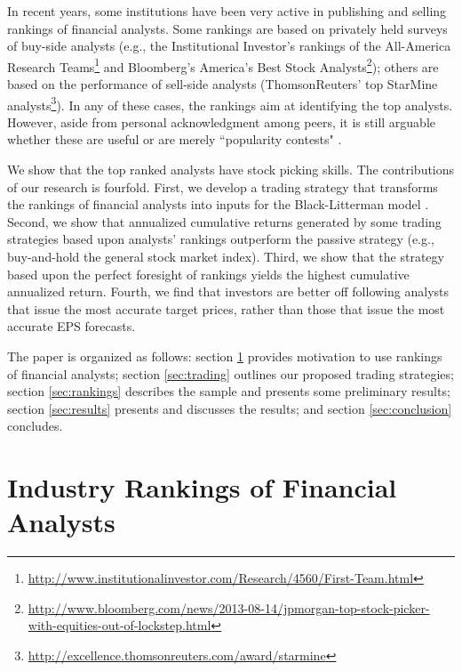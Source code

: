 \documentclass{book}
\begin{document}
In recent years, some institutions have been very active in publishing and  selling  rankings of financial analysts. Some rankings  are based on privately held surveys of  buy-side analysts (e.g., the Institutional Investor's rankings of the All-America Research Teams\footnote{\url{http://www.institutionalinvestor.com/Research/4560/First-Team.html}} and Bloomberg's America's Best Stock Analysts\footnote{\sloppy \url{http://www.bloomberg.com/news/2013-08-14/jpmorgan-top-stock-picker-with-equities-out-of-lockstep.html}}); others are based on the performance of sell-side analysts (ThomsonReuters' top StarMine analysts\footnote{\url{http://excellence.thomsonreuters.com/award/starmine}}). In any of these cases, the rankings aim at identifying the top analysts. However, aside from personal acknowledgment among peers, it is still arguable whether these are useful \citep{desai2000ass} or are merely ``popularity contests" \citep{emery2009}. %


We show that the top ranked analysts have stock picking skills. The contributions of our research is fourfold. First, we develop a trading strategy that transforms the rankings of financial analysts into inputs for the Black-Litterman model \citep{black1992}. Second, we show that annualized cumulative returns generated by some trading strategies  based upon analysts' rankings outperform the passive strategy (e.g., buy-and-hold the general stock market index). Third, we show that the strategy based upon the perfect foresight of rankings yields the highest cumulative annualized return. Fourth, we find that investors  are better off following analysts that issue the most accurate target prices, rather than those that issue the most accurate EPS forecasts.



The paper is organized as follows: section \ref{sec:ranking} provides motivation to use rankings of financial analysts; section \ref{sec:trading} outlines our proposed  trading strategies; section \ref{sec:rankings} describes the sample and presents some preliminary results; section \ref{sec:results} presents and discusses the results; and section \ref{sec:conclusion} concludes.

\section{Industry Rankings of Financial Analysts}
\label{sec:ranking}
\end{document}
